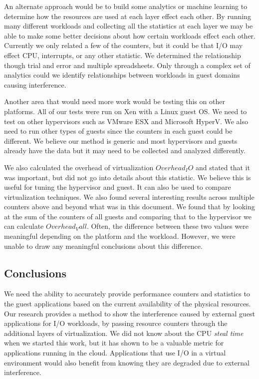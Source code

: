 An alternate approach would be to build some analytics or machine learning to determine how the resources are used at each layer effect each other.  By running many different workloads and collecting all the statistics at each layer we may be able to make some better decisions about how certain workloads effect each other.  Currently we only related a few of the counters, but it could be that I/O may effect CPU, interrupts, or any other statistic.  We determined the relationship though trial and error and multiple spreadsheets.  Only through a complex set of analytics could we identify relationships between workloads in guest domains causing interference.

Another area that would need more work would be testing this on other platforms.  All of our tests were run on Xen with a Linux guest OS.  We need to test on other hypervisors such as VMware ESX and Microsoft HyperV.  We also need to run other types of guests since the counters in each guest could be different.  We believe our method is generic and most hypervisors and guests already have the data but it may need to be collected and analyzed differently.

We also calculated the overhead of virtualization $Overhead_IO$ and stated that it was important, but did not go into details about this statistic.  We believe this is useful for tuning the hypervisor and guest.  It can also be used to compare virtualization techniques.  We also found several interesting results across multiple counters above and beyond what was in this document.  We found that by looking at the sum of the counters of all guests and comparing that to the hypervisor we can calculate $Overhead_Vall$.  Often, the difference between these two values were meaningful depending on the platform and the workload.  However, we were unable to draw any meaningful conclusions about this difference. 


\subsection{Conclusions}
We need the ability to accurately provide performance counters and statistics to the guest applications based on the current availability of the physical resources.  Our research provides a method to show the interference caused by external guest applications for I/O workloads, by passing resource counters through the additional layers of virtualization.  We did not know about the CPU \emph{steal time} when we started this work, but it has shown to be a valuable metric for applications running in the cloud.  Applications that use I/O in a virtual environment would also benefit from knowing they are degraded due to external interference.  
